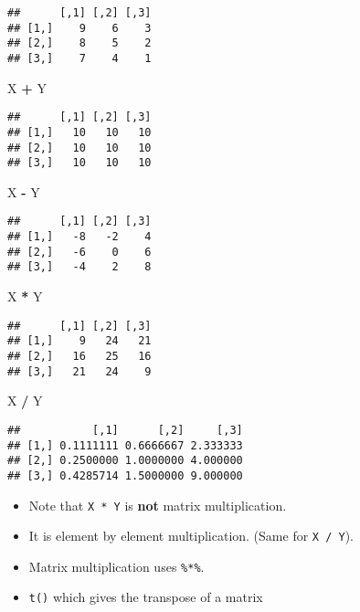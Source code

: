 \documentclass[]{book}
\newenvironment{Shaded}{\begin{snugshade}}{\end{snugshade}}
\newcommand{\NormalTok}[1]{#1}
\newcommand{\OperatorTok}[1]{\textcolor[rgb]{0.81,0.36,0.00}{\textbf{#1}}}
\newcommand{\StringTok}[1]{\textcolor[rgb]{0.31,0.60,0.02}{#1}}
\begin{document}
\begin{verbatim}
##      [,1] [,2] [,3]
## [1,]    9    6    3
## [2,]    8    5    2
## [3,]    7    4    1
\end{verbatim}

\begin{Shaded}
\begin{Highlighting}[]
\NormalTok{X }\OperatorTok{+}\StringTok{ }\NormalTok{Y}
\end{Highlighting}
\end{Shaded}

\begin{verbatim}
##      [,1] [,2] [,3]
## [1,]   10   10   10
## [2,]   10   10   10
## [3,]   10   10   10
\end{verbatim}

\begin{Shaded}
\begin{Highlighting}[]
\NormalTok{X }\OperatorTok{-}\StringTok{ }\NormalTok{Y}
\end{Highlighting}
\end{Shaded}

\begin{verbatim}
##      [,1] [,2] [,3]
## [1,]   -8   -2    4
## [2,]   -6    0    6
## [3,]   -4    2    8
\end{verbatim}

\begin{Shaded}
\begin{Highlighting}[]
\NormalTok{X }\OperatorTok{*}\StringTok{ }\NormalTok{Y}
\end{Highlighting}
\end{Shaded}

\begin{verbatim}
##      [,1] [,2] [,3]
## [1,]    9   24   21
## [2,]   16   25   16
## [3,]   21   24    9
\end{verbatim}

\begin{Shaded}
\begin{Highlighting}[]
\NormalTok{X }\OperatorTok{/}\StringTok{ }\NormalTok{Y}
\end{Highlighting}
\end{Shaded}

\begin{verbatim}
##           [,1]      [,2]     [,3]
## [1,] 0.1111111 0.6666667 2.333333
## [2,] 0.2500000 1.0000000 4.000000
## [3,] 0.4285714 1.5000000 9.000000
\end{verbatim}

\begin{itemize}
\item
  Note that \texttt{X\ *\ Y} is \textbf{not} matrix multiplication.
\item
  It is element by element multiplication. (Same for \texttt{X\ /\ Y}).
\item
  Matrix multiplication uses \texttt{\%*\%}.
\item
  \texttt{t()} which gives the transpose of a matrix
\end{itemize}
\end{document}
